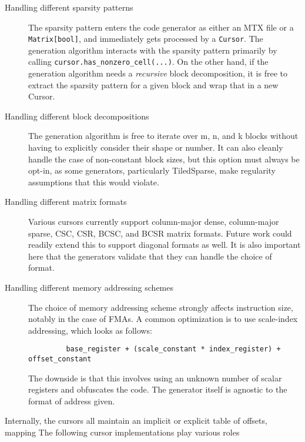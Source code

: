     \begin{description}
        \item[Handling different sparsity patterns] The sparsity pattern enters the code generator as either an MTX file or a \texttt{Matrix[bool]}, and immediately gets processed by a \texttt{Cursor}. The generation algorithm interacts with the sparsity pattern primarily by calling \texttt{cursor.has_nonzero_cell(...)}. On the other hand, if the generation algorithm needs a \emph{recursive} block decomposition, it is free to extract the sparsity pattern for a given block and wrap that in a new Cursor. 

        \item[Handling different block decompositions] The generation algorithm is free to iterate over m, n, and k blocks without having to explicitly consider their shape or number. It can also cleanly handle the case of non-constant block sizes, but this option must always be opt-in, as some generators, particularly TiledSparse, make regularity assumptions that this would violate. 

        \item[Handling different matrix formats] Various cursors currently support column-major dense, column-major sparse, CSC, CSR, BCSC, and BCSR matrix formats. Future work could readily extend this to support diagonal formats as well. It is also important here that the generators validate that they can handle the choice of format. 

        \item[Handling different memory addressing schemes] The choice of memory addressing scheme strongly affects instruction size, notably in the case of FMAs. A common optimization is to use scale-index addressing, which looks as follows:

         \begin{verbatim}
         base_register + (scale_constant * index_register) + offset_constant
         \end{verbatim}

         The downside is that this involves using an unknown number of scalar registers and obfuscates the code. The generator itself is agnostic to the format of address given.

    \end{description}

Internally, the cursors all maintain an implicit or explicit table of offsets, mapping 
    The following cursor implementations play various roles 

